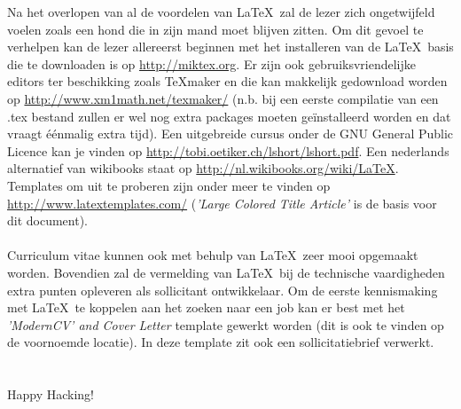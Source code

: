 \documentclass[paper=a4, fontsize=12pt, onecolumn]{scrartcl}
\begin{document}
Na het overlopen van al de voordelen van \LaTeX\ zal de lezer zich ongetwijfeld voelen zoals een hond die in zijn mand moet blijven zitten. Om dit gevoel te verhelpen kan de lezer allereerst beginnen met het installeren van de \LaTeX\ basis die te downloaden is op \url{http://miktex.org}. Er zijn ook gebruiksvriendelijke editors ter beschikking zoals \TeX maker en die kan makkelijk gedownload worden op \url{http://www.xm1math.net/texmaker/} (n.b. bij een eerste compilatie van een .tex bestand zullen er wel nog extra packages moeten ge\"installeerd worden en dat vraagt \'e\'enmalig extra tijd). Een uitgebreide cursus onder de GNU General Public Licence kan je vinden op \url{http://tobi.oetiker.ch/lshort/lshort.pdf}. Een nederlands alternatief van wikibooks staat op \url{http://nl.wikibooks.org/wiki/LaTeX}. Templates om uit te proberen zijn onder meer te vinden op \url{http://www.latextemplates.com/} (\textit{'Large Colored Title Article'} is de basis voor dit document).  
\paragraph{}Curriculum vitae kunnen ook met behulp van \LaTeX\ zeer mooi opgemaakt worden. Bovendien zal de vermelding van \LaTeX\ bij de technische vaardigheden extra punten opleveren als sollicitant ontwikkelaar. Om de eerste kennismaking met \LaTeX\ te koppelen aan het zoeken naar een job kan er best met het \textit{'ModernCV' and Cover Letter} template gewerkt worden (dit is ook te vinden op de voornoemde locatie). In deze template zit ook een sollicitatiebrief verwerkt.\\~\\~\\

Happy Hacking!
\end{document}
